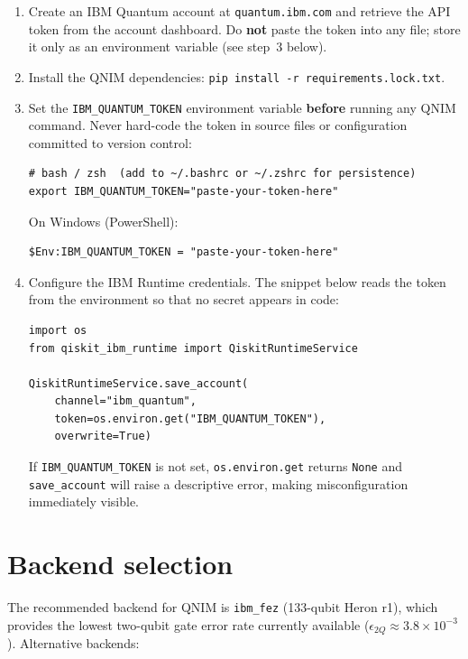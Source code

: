 \documentclass[11pt,a4paper, english]{book}
\theoremstyle{plain}
\theoremstyle{definition}
\numberwithin{equation}{chapter}
\numberwithin{figure}{chapter}
\numberwithin{table}{chapter}
\begin{document}
\begin{enumerate}
  \item Create an IBM Quantum account at \texttt{quantum.ibm.com} and
        retrieve the API token from the account dashboard.  Do
        \textbf{not} paste the token into any file; store it only as an
        environment variable (see step~3 below).
  \item Install the QNIM dependencies:
        \texttt{pip install -r requirements.lock.txt}.
  \item Set the \texttt{IBM\_QUANTUM\_TOKEN} environment variable
        \textbf{before} running any QNIM command.  Never hard-code the
        token in source files or configuration committed to version control:
        \begin{verbatim}
# bash / zsh  (add to ~/.bashrc or ~/.zshrc for persistence)
export IBM_QUANTUM_TOKEN="paste-your-token-here"
        \end{verbatim}
        On Windows (PowerShell):
        \begin{verbatim}
$Env:IBM_QUANTUM_TOKEN = "paste-your-token-here"
        \end{verbatim}

  \item Configure the IBM Runtime credentials.  The snippet below reads
        the token from the environment so that no secret appears in code:
        \begin{verbatim}
import os
from qiskit_ibm_runtime import QiskitRuntimeService

QiskitRuntimeService.save_account(
    channel="ibm_quantum",
    token=os.environ.get("IBM_QUANTUM_TOKEN"),
    overwrite=True)
        \end{verbatim}
        If \texttt{IBM\_QUANTUM\_TOKEN} is not set,
        \texttt{os.environ.get} returns \texttt{None} and
        \texttt{save\_account} will raise a descriptive error, making
        misconfiguration immediately visible.
\end{enumerate}

\section{Backend selection}
\label{app:ibm-backend-selection}

The recommended backend for QNIM is \texttt{ibm\_fez} (133-qubit Heron r1),
which provides the lowest two-qubit gate error rate currently available
($\epsilon_{2Q} \approx 3.8\times10^{-3}$).  Alternative backends:
\end{document}
